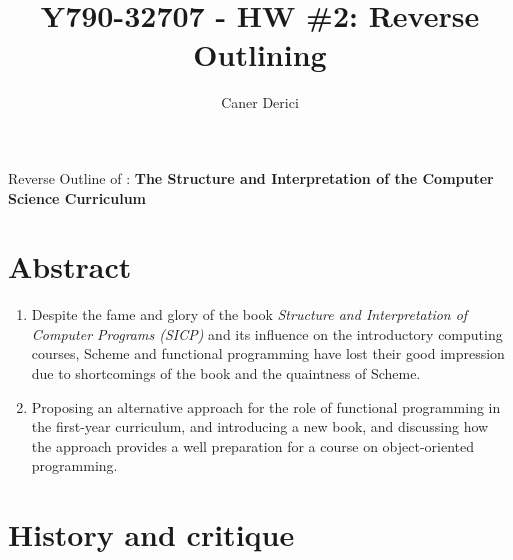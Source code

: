 \documentclass{article}
\title{Y790-32707 - HW \#2: Reverse Outlining}
\author{}
\date{Caner Derici}
\begin{document}

\maketitle



\begin{center}
  Reverse Outline of : \textbf{The Structure and Interpretation of the Computer Science Curriculum}
\end{center}

\section*{Abstract}

\begin{enumerate}
\item Despite the fame and glory of the book \textit{Structure and
  Interpretation of Computer Programs (SICP)} and its influence on the
  introductory computing courses, Scheme and functional programming
  have lost their good impression due to shortcomings of the book and
  the quaintness of Scheme.
\item Proposing an alternative approach for the role of functional
  programming in the first-year curriculum, and introducing a new
  book, and discussing how the approach provides a well preparation
  for a course on object-oriented programming.
\end{enumerate}

\section{History and critique}
\end{document}
